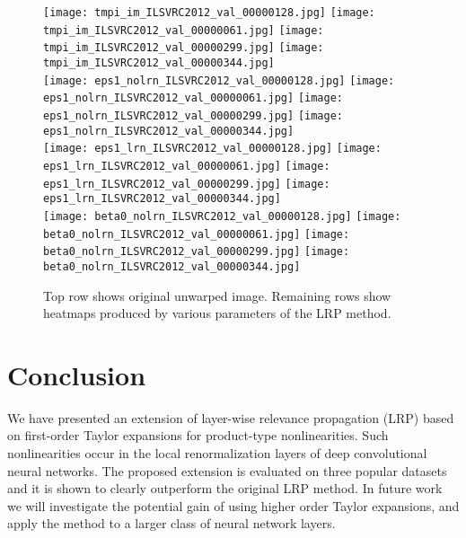 \documentclass[runningheads,a4paper]{llncs}
\begin{document}
\begin{figure}[t]
\centering \small
{}
\texttt{[image: tmpi\_im\_ILSVRC2012\_val\_00000128.jpg]} 
\texttt{[image: tmpi\_im\_ILSVRC2012\_val\_00000061.jpg]}
\texttt{[image: tmpi\_im\_ILSVRC2012\_val\_00000299.jpg]} 
\texttt{[image: tmpi\_im\_ILSVRC2012\_val\_00000344.jpg]}\\[1mm]
\texttt{[image: eps1\_nolrn\_ILSVRC2012\_val\_00000128.jpg]} 
\texttt{[image: eps1\_nolrn\_ILSVRC2012\_val\_00000061.jpg]} 
\texttt{[image: eps1\_nolrn\_ILSVRC2012\_val\_00000299.jpg]} 
\texttt{[image: eps1\_nolrn\_ILSVRC2012\_val\_00000344.jpg]}\\[1mm]
\texttt{[image: eps1\_lrn\_ILSVRC2012\_val\_00000128.jpg]} 
\texttt{[image: eps1\_lrn\_ILSVRC2012\_val\_00000061.jpg]} 
\texttt{[image: eps1\_lrn\_ILSVRC2012\_val\_00000299.jpg]} 
\texttt{[image: eps1\_lrn\_ILSVRC2012\_val\_00000344.jpg]}\\[1mm]
\texttt{[image: beta0\_nolrn\_ILSVRC2012\_val\_00000128.jpg]} 
\texttt{[image: beta0\_nolrn\_ILSVRC2012\_val\_00000061.jpg]} 
\texttt{[image: beta0\_nolrn\_ILSVRC2012\_val\_00000299.jpg]} 
\texttt{[image: beta0\_nolrn\_ILSVRC2012\_val\_00000344.jpg]}\\[1mm]
\caption{\label{fig:examples_lrn_vs_nolrn}Top row shows original unwarped image. Remaining rows show heatmaps produced by various parameters of the LRP method.}
\end{figure}

\section{Conclusion}

We have presented an extension of layer-wise relevance propagation (LRP) based on first-order Taylor expansions for product-type nonlinearities. Such nonlinearities occur in the local renormalization layers of deep convolutional neural networks. The proposed extension is evaluated on three popular datasets and it is shown to clearly outperform the original LRP method. In future work we will investigate the potential gain of using higher order Taylor expansions, and apply the method to a larger class of neural network layers.




\end{document}
